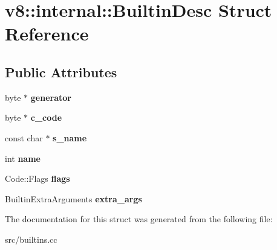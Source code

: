 \hypertarget{structv8_1_1internal_1_1_builtin_desc}{}\section{v8\+:\+:internal\+:\+:Builtin\+Desc Struct Reference}
\label{structv8_1_1internal_1_1_builtin_desc}
\subsection*{Public Attributes}
\begin{DoxyCompactItemize}
\item 
\hypertarget{structv8_1_1internal_1_1_builtin_desc_a8d9840427cd826f45dec70609105ba37}{}byte $\ast$ {\bfseries generator}\label{structv8_1_1internal_1_1_builtin_desc_a8d9840427cd826f45dec70609105ba37}

\item 
\hypertarget{structv8_1_1internal_1_1_builtin_desc_a166adea6c36f33103818b4e4f1f2e79e}{}byte $\ast$ {\bfseries c\+\_\+code}\label{structv8_1_1internal_1_1_builtin_desc_a166adea6c36f33103818b4e4f1f2e79e}

\item 
\hypertarget{structv8_1_1internal_1_1_builtin_desc_a2d6009bad9ff4adcd8a5ed9d5b9bf81a}{}const char $\ast$ {\bfseries s\+\_\+name}\label{structv8_1_1internal_1_1_builtin_desc_a2d6009bad9ff4adcd8a5ed9d5b9bf81a}

\item 
\hypertarget{structv8_1_1internal_1_1_builtin_desc_ac5f39ddcf768e3708f9be037d8cb2d3c}{}int {\bfseries name}\label{structv8_1_1internal_1_1_builtin_desc_ac5f39ddcf768e3708f9be037d8cb2d3c}

\item 
\hypertarget{structv8_1_1internal_1_1_builtin_desc_a43b6bda5f3635c550f28b68083399e0d}{}Code\+::\+Flags {\bfseries flags}\label{structv8_1_1internal_1_1_builtin_desc_a43b6bda5f3635c550f28b68083399e0d}

\item 
\hypertarget{structv8_1_1internal_1_1_builtin_desc_a5e6594d6eee0954262806528f6b629d5}{}Builtin\+Extra\+Arguments {\bfseries extra\+\_\+args}\label{structv8_1_1internal_1_1_builtin_desc_a5e6594d6eee0954262806528f6b629d5}

\end{DoxyCompactItemize}


The documentation for this struct was generated from the following file\+:\begin{DoxyCompactItemize}
\item 
src/builtins.\+cc\end{DoxyCompactItemize}
